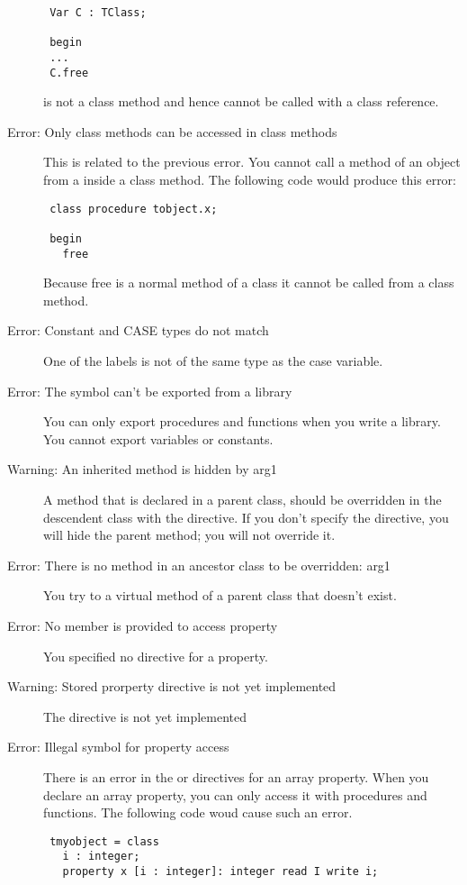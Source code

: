 \begin{description}
\begin{verbatim}
 Var C : TClass;

 begin
 ...
 C.free
 \end{verbatim}
  is not a class method and hence cannot be called with a class
 reference.
\item [Error: Only class methods can be accessed in class methods]
 This is related to the previous error. You cannot call a method of an object
 from a inside a class method. The following code would produce this error:
 \begin{verbatim}
 class procedure tobject.x;

 begin
   free
 \end{verbatim}
 Because free is a normal method of a class it cannot be called from a class
 method.
\item [Error: Constant and CASE types do not match]
 One of the labels is not of the same type as the case variable.
\item [Error: The symbol can't be exported from a library]
 You can only export procedures and functions when you write a library. You
 cannot export variables or constants.
\item [Warning: An inherited method is hidden by arg1]
 A method that is declared  in a parent class, should be
 overridden in the descendent class with the  directive. If you
 don't specify the  directive, you will hide the parent method;
 you will not override it.
\item [Error: There is no method in an ancestor class to be overridden: arg1]
 You try to  a virtual method of a parent class that doesn't
 exist.
\item [Error: No member is provided to access property]
 You specified no  directive for a property.
\item [Warning: Stored prorperty directive is not yet implemented]
 The  directive is not yet implemented
\item [Error: Illegal symbol for property access]
 There is an error in the  or  directives for an array
 property. When you declare an array property, you can only access it with
 procedures and functions. The following code woud cause such an error.
 \begin{verbatim}
 tmyobject = class
   i : integer;
   property x [i : integer]: integer read I write i;
 \end{verbatim}


\end{description}
